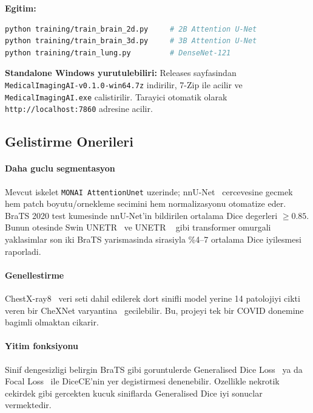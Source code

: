 \documentclass[conference]{IEEEtran}
\begin{document}
\noindent\textbf{Egitim:}
\begin{lstlisting}[language=bash]
python training/train_brain_2d.py     # 2B Attention U-Net
python training/train_brain_3d.py     # 3B Attention U-Net
python training/train_lung.py         # DenseNet-121
\end{lstlisting}

\noindent\textbf{Standalone Windows yurutulebiliri:} Releases sayfasindan
\texttt{MedicalImagingAI-v0.1.0-win64.7z} indirilir, 7-Zip ile acilir ve
\texttt{MedicalImagingAI.exe} calistirilir. Tarayici otomatik olarak
\texttt{http://localhost:7860} adresine acilir.

\subsection{Gelistirme Onerileri}

\paragraph{Daha guclu segmentasyon} Mevcut iskelet \texttt{MONAI AttentionUnet}
uzerinde; nnU-Net~\cite{isensee2021nnunet} cercevesine gecmek hem patch
boyutu/ornekleme sec\-imini hem normalizasyonu otomatize eder. BraTS 2020 test
kumesinde nnU-Net'in bildirilen ortalama Dice degerleri $\geq 0.85$. Bunun
otesinde Swin UNETR~\cite{hatamizadeh2022swinunetr} ve UNETR
~\cite{hatamizadeh2022unetr} gibi transformer omurgali yaklasimlar son iki
BraTS yarismasinda sirasiyla \%4--7 ortalama Dice iyilesmesi raporladi.

\paragraph{Genellestirme} ChestX-ray8~\cite{wang2017chestxray8} veri seti dahil
edilerek dort sinifli model yerine 14 patolojiyi cikti veren bir CheXNet
varyantina~\cite{rajpurkar2017chexnet} gecilebilir. Bu, projeyi tek bir COVID
donemine bagimli olmaktan cikarir.

\paragraph{Yitim fonksiyonu} Sinif dengesizligi belirgin BraTS gibi
goruntulerde Generalised Dice Loss~\cite{sudre2017generalised} ya da Focal
Loss~\cite{lin2017focal} ile DiceCE'nin yer degistirmesi denenebilir.
Ozellikle nekrotik cekirdek gibi gercekten kucuk siniflarda Generalised Dice
iyi sonuclar vermektedir.
\end{document}
